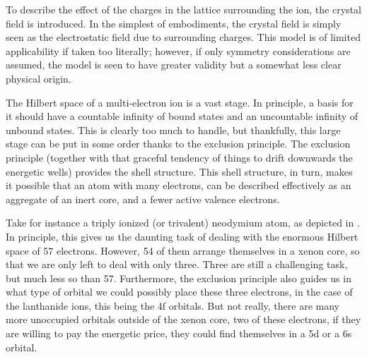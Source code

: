 \documentclass[11pt, twoside,openright]{article}
\begin{document}
To describe the effect of the charges in the lattice surrounding the ion, the crystal field is introduced. In the simplest of embodiments, the crystal field is simply seen as the electrostatic field due to surrounding charges. This model is of limited applicability if taken too literally; however, if only symmetry considerations are assumed, the model is seen to have greater validity but a somewhat less clear physical origin.

The Hilbert space of a multi-electron ion is a vast stage. In principle, a basis for it should have a countable infinity of bound states and an uncountable infinity of unbound states. This is clearly too much to handle, but thankfully, this large stage can be put in some order thanks to the exclusion principle. The exclusion principle (together with that graceful tendency of things to drift downwards the energetic wells) provides the shell structure. This shell structure, in turn, makes it possible that an atom with many electrons, can be described effectively as an aggregate of an inert core, and a fewer active valence electrons.  

Take for instance a triply ionized (or trivalent) neodymium atom, as depicted in . In principle, this gives us the daunting task of dealing with the enormous Hilbert space of 57 electrons. However, 54 of them arrange themselves in a xenon core, so that we are only left to deal with only three. Three are still a challenging task, but much less so than  57. Furthermore, the exclusion principle also guides us in what type of orbital we could possibly place these three electrons, in the case of the lanthanide ions, this being the 4f orbitals. But not really, there are many more unoccupied orbitals outside of the xenon core, two of these electrons, if they are willing to pay the energetic price, they could find themselves in a 5d or a 6s orbital.  
\end{document}
